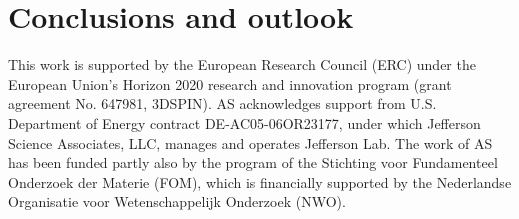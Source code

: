 \documentclass[aps,preprintnumbers,showpacs,nofootinbib,superscriptaddress,floatfix]{revtex4}
\begin{document}
\section{Conclusions and outlook}
\label{s:end}






\begin{acknowledgments}
This work is supported by the European Research Council (ERC) under the European Union's Horizon 2020 research and innovation program (grant agreement No. 647981, 3DSPIN). 
AS acknowledges support from U.S. Department of Energy contract DE-AC05-06OR23177, under which Jefferson Science Associates, LLC, manages and operates Jefferson Lab. 
The work of AS has been funded partly also by the program of the Stichting voor Fundamenteel Onderzoek der Materie (FOM), which is financially supported by the Nederlandse Organisatie voor Wetenschappelijk Onderzoek (NWO).
\end{acknowledgments}



%
%


%
%
\end{document}
